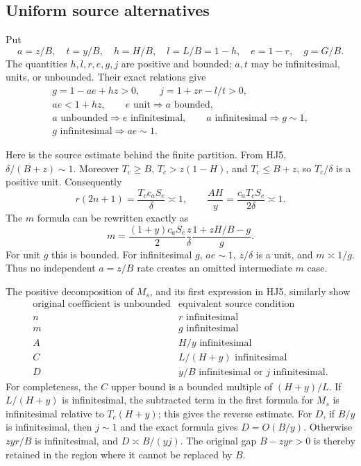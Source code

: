 \subsection{Uniform source alternatives}

Put
\[
 a=z/B,\quad t=y/B,\quad h=H/B,\quad l=L/B=1-h,\quad
 e=1-r,\quad g=G/B.
 \tag{HJ9}
\]
The quantities \(h,l,r,e,g,j\) are positive and bounded;
\(a,t\) may be infinitesimal, units, or unbounded.
Their exact relations give
\[
\begin{gathered}
 g=1-ae+hz>0,\qquad j=1+zr-l/t>0,\\
 ae<1+hz,\qquad
 e\text{ unit}\Longrightarrow a\text{ bounded},\\
 a\text{ unbounded}\Longrightarrow e\text{ infinitesimal},
 \qquad a\text{ infinitesimal}\Longrightarrow g\sim1,\\
 g\text{ infinitesimal}\Longrightarrow ae\sim1.
\end{gathered}
\tag{HJ10}
\]

Here is the source estimate behind the finite partition.
From HJ5,
\(\delta/(B+z)\sim1\).
Moreover \(T_c\geq B\), \(T_c>z(1-H)\), and
\(T_c\leq B+z\), so \(T_c/\delta\) is a positive unit.
Consequently
\[
 r(2n+1)=\frac{T_cc_aS_c}{\delta}\asymp1,\qquad
 \frac{AH}{y}=\frac{c_aT_cS_c}{2\delta}\asymp1.
 \tag{HJ11}
\]
The \(m\) formula can be rewritten exactly as
\[
 m=\frac{(1+y)c_aS_c}{2}\frac z\delta
               \frac{1+zH/B-g}{g}.
 \tag{HJ12}
\]
For unit \(g\) this is bounded.  For infinitesimal \(g\),
\(ae\sim1\), \(z/\delta\) is a unit, and \(m\asymp1/g\).
Thus no independent \(a=z/B\) rate creates an omitted
intermediate \(m\) case.

The positive decomposition of \(M_s\), and its first
expression in HJ5, similarly show
\[
\begin{array}{c|c}
 \text{original coefficient is unbounded}
       &\text{equivalent source condition}\\ \hline
 n&r\text{ infinitesimal}\\
 m&g\text{ infinitesimal}\\
 A&H/y\text{ infinitesimal}\\
 C&L/(H+y)\text{ infinitesimal}\\
 D&y/B\text{ infinitesimal or }j\text{ infinitesimal}.
\end{array}
\tag{HJ13}
\]
For completeness, the \(C\) upper bound is a bounded
multiple of \((H+y)/L\).
If \(L/(H+y)\) is infinitesimal, the subtracted
term in the first formula for \(M_s\) is
infinitesimal relative to \(T_c(H+y)\);
this gives the reverse estimate.
For \(D\), if \(B/y\) is infinitesimal, then
\(j\sim1\) and the exact formula gives \(D=O(B/y)\).
Otherwise \(zyr/B\) is infinitesimal, and
\(D\asymp B/(yj)\).
The original gap \(B-zyr>0\) is thereby retained in
the region where it cannot be replaced by \(B\).

